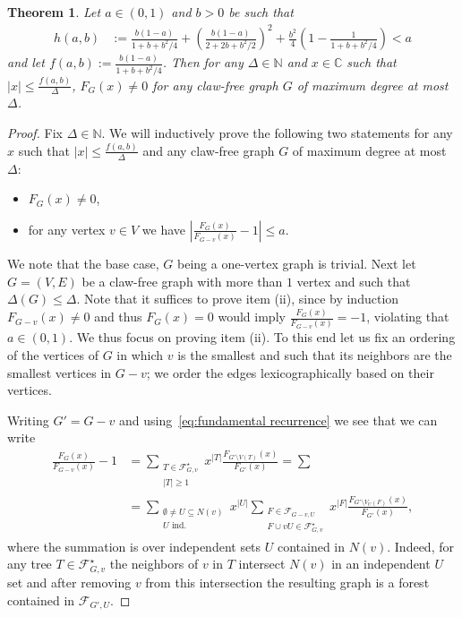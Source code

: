 \documentclass[a4paper,11pt,reqno]{amsart}
\newtheorem{theorem}[corollary]{Theorem}
\numberwithin{equation}{section}
\begin{document}
\begin{theorem}\label{thm:main claw-free}
Let $a\in (0,1)$ and $b>0$ be such that
 \begin{align*}
%
    h(a,b)&:=\tfrac{b(1-a)}{1+b+b^2/4}+\left(\tfrac{b(1-a)}{2+2b+b^2/2}\right)^2+\tfrac{b^2}{4}\left(1-\tfrac{1}{1+b+b^2/4}\right)<a
    \end{align*}
and let $f(a,b):=\tfrac{b(1-a)}{1+b+b^2/4}$.
Then for any $\Delta\in \mathbb{N}$ and $x\in \mathbb{C}$ such that $|x|\leq \tfrac{f(a,b)}{\Delta}$, $F_G(x)\neq 0$ for any claw-free graph $G$ of maximum degree at most $\Delta$.
\end{theorem}
\begin{proof}
Fix $\Delta\in \mathbb{N}$.
We will inductively prove the following two statements for any $x$ such that $|x|\leq \tfrac{f(a,b)}{\Delta}$ and any claw-free graph $G$ of maximum degree at most $\Delta$:
\begin{itemize}
    \item[(i)] \label{it:claw_free i} $F_{G}(x)\neq 0$, 
    \item[(ii)] \label{it:claw_free ii} for any vertex $v\in V$ we have $\left|\frac{F_{G}(x)}{F_{G-v}(x)}-1\right|\leq a$.
\end{itemize}

We note that the base case, $G$ being a one-vertex graph is trivial.
Next let $G=(V,E)$ be a claw-free graph with more than $1$ vertex and such that $\Delta(G)\leq \Delta$.
Note that it suffices to prove item (ii), since by induction $F_{G-v}(x)\neq 0$ and thus $F_G(x)=0$ would imply $\tfrac{F_{G}(x)}{F_{G-v}(x)}=-1$, violating that $a\in (0,1)$.
We thus focus on proving item (ii). To this end let us fix an ordering of the vertices of $G$ in which $v$ is the smallest and such that its neighbors are the smallest vertices in $G-v$; we order the edges lexicographically based on their vertices.

Writing $G'=G-v$ and using~\eqref{eq:fundamental recurrence} we see that we can write
\begin{align}
\frac{F_{G}(x)}{F_{G-v}(x)}-1&=\sum_{\substack{T\in \mathcal{F}^\star_{G,v}\\|T|\geq 1}}x^{|T|}\frac{F_{G'\setminus V(T)}(x)}{F_{G'}(x)}=\sum_{}\nonumber
\\
&=\sum_{\substack{\emptyset\neq U\subseteq N(v)\\ U \text{ ind.}}}x^{|U|}\sum_{\substack{F\in \mathcal{F}_{G-v,U}\\F\cup vU \in \mathcal{F}^\star_{G,v}}}x^{|F|} \frac{F_{G'\setminus V_U(F)}(x)}{F_{G'}(x)},\label{eq:U expansion}
\end{align}
where the summation is over independent sets $U$ contained in $N(v).$
Indeed, for any tree $T\in \mathcal{F}^\star_{G,v}$ the neighbors of $v$ in $T$ intersect $N(v)$ in an independent $U$ set and after removing $v$ from this intersection the resulting graph is a forest contained in $\mathcal{F}_{G',U}$. 


\end{proof}
\end{document}
